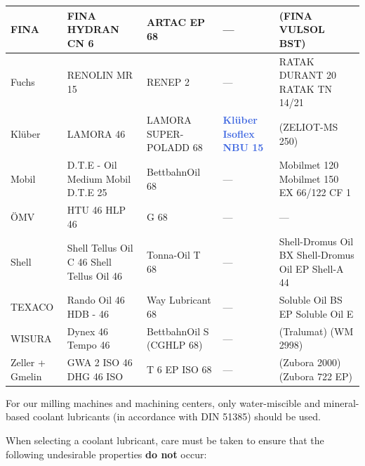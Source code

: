 \begin{longtable}{|p{2.2cm}|p{2.7cm}|p{3cm}|p{3cm}|p{4.5cm}|}
    \hline
    FINA & FINA \newline HYDRAN CN 6 & ARTAC EP 68 & --- & (FINA VULSOL BST) \\
    \hline
    Fuchs & RENOLIN MR 15 & RENEP 2 & --- & RATAK DURANT 20 \newline RATAK TN 14/21 \\
    \hline
    Klüber & LAMORA 46 & LAMORA SUPER-POLADD 68 & \textcolor{RoyalBlue}{\textbf{Klüber Isoflex NBU 15}} & (ZELIOT-MS 250) \\
    \hline
    Mobil & D.T.E - Oil Medium \newline Mobil D.T.E 25 & BettbahnOil 68 & --- & Mobilmet 120 \newline Mobilmet 150 \newline EX 66/122 CF 1 \\
    \hline
    ÖMV & HTU 46 \newline HLP 46 & G 68 & --- & --- \\
    \hline
    Shell & Shell Tellus Oil C 46 \newline Shell Tellus Oil 46 & Tonna-Oil T 68 & --- & Shell-Dromus Oil BX \newline Shell-Dromus Oil EP \newline Shell-A 44 \\
    \hline
    TEXACO & Rando Oil 46 \newline HDB - 46 & Way Lubricant 68 & --- & Soluble Oil BS EP \newline Soluble Oil E \\
    \hline
    WISURA & Dynex 46 \newline Tempo 46 & BettbahnOil \newline 68 S (CGHLP 68) & --- & (Tralumat) \newline (WM 2998) \\
    \hline
    Zeller + Gmelin & GWA 2 ISO 46 \newline DHG 46 ISO & T 6 EP ISO 68 & --- & (Zubora 2000) \newline (Zubora 722 EP) \\
    \hline
\end{longtable}


For our milling machines and machining centers, only water-miscible and mineral-based coolant lubricants (in accordance with DIN 51385) should be used.

When selecting a coolant lubricant, care must be taken to ensure that the following undesirable properties \textbf{do not} occur:


